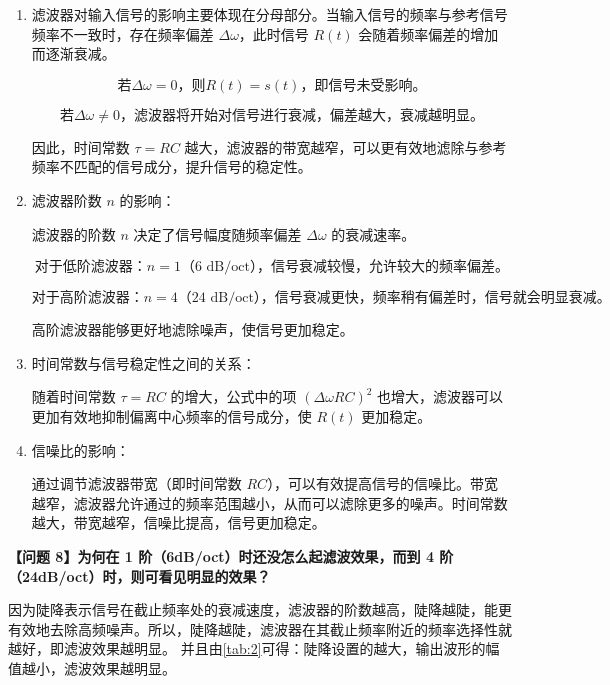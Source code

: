 \documentclass[dvipsnames, svgnames,a4paper,11pt]{article}
\begin{document}
		\begin{enumerate}
			\item 滤波器对输入信号的影响主要体现在分母部分。当输入信号的频率与参考信号频率不一致时，存在频率偏差 \( \Delta\omega \)，此时信号 \( R(t) \) 会随着频率偏差的增加而逐渐衰减。
			
			\[
			\text{若} \Delta\omega = 0 \text{，则} R(t) = s(t) \text{，即信号未受影响。}
			\]
			
			\[
			\text{若} \Delta\omega \neq 0 \text{，滤波器将开始对信号进行衰减，偏差越大，衰减越明显。}
			\]
			
			因此，时间常数 \( \tau = RC \) 越大，滤波器的带宽越窄，可以更有效地滤除与参考频率不匹配的信号成分，提升信号的稳定性。
			
			\item 滤波器阶数 \( n \) 的影响：
			
			滤波器的阶数 \( n \) 决定了信号幅度随频率偏差 \( \Delta\omega \) 的衰减速率。
			
			\[
			\text{对于低阶滤波器：} n = 1 \text{（6 dB/oct），信号衰减较慢，允许较大的频率偏差。}
			\]
			
			\[
			\text{对于高阶滤波器：} n = 4 \text{（24 dB/oct），信号衰减更快，频率稍有偏差时，信号就会明显衰减。}
			\]
			
			高阶滤波器能够更好地滤除噪声，使信号更加稳定。
			
			\item 时间常数与信号稳定性之间的关系：
			
			随着时间常数 \( \tau = RC \) 的增大，公式中的项 \( (\Delta\omega R C)^2 \) 也增大，滤波器可以更加有效地抑制偏离中心频率的信号成分，使 \( R(t) \) 更加稳定。
			
			\item 信噪比的影响：
			
			通过调节滤波器带宽（即时间常数 \( RC \)），可以有效提高信号的信噪比。带宽越窄，滤波器允许通过的频率范围越小，从而可以滤除更多的噪声。时间常数越大，带宽越窄，信噪比提高，信号更加稳定。
			
		\end{enumerate}


		\textbf{【问题 8】为何在 1 阶（6dB/oct）时还没怎么起滤波效果，而到 4 阶（24dB/oct）时，则可看见明显的效果？}
		
		因为陡降表示信号在截止频率处的衰减速度，滤波器的阶数越高，陡降越陡，能更有效地去除高频噪声。所以，陡降越陡，滤波器在其截止频率附近的频率选择性就越好，即滤波效果越明显。
		并且由\ref{tab:2}可得：陡降设置的越大，输出波形的幅值越小，滤波效果越明显。
\end{document}
